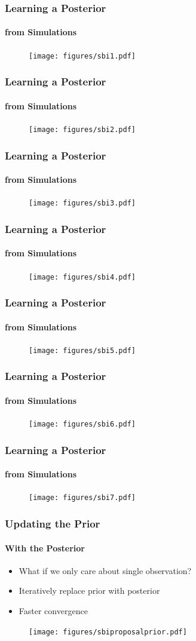 \documentclass[9pt, aspectratio=169]{beamer}
\begin{document}
\begin{frame}
\frametitle{Learning a Posterior}
\framesubtitle{from Simulations}
\begin{figure}
	\texttt{[image: figures/sbi1.pdf]}
\end{figure}
\end{frame} 
\begin{frame}
\frametitle{Learning a Posterior}
\framesubtitle{from Simulations}
\begin{figure}
	\texttt{[image: figures/sbi2.pdf]}
\end{figure}
\end{frame} \begin{frame}
\frametitle{Learning a Posterior}
\framesubtitle{from Simulations}
\begin{figure}
\texttt{[image: figures/sbi3.pdf]}
\end{figure}
\end{frame} \begin{frame}
\frametitle{Learning a Posterior}
\framesubtitle{from Simulations}
\begin{figure}
\texttt{[image: figures/sbi4.pdf]}
\end{figure}
\end{frame} \begin{frame}
\frametitle{Learning a Posterior}
\framesubtitle{from Simulations}
\begin{figure}
\texttt{[image: figures/sbi5.pdf]}
\end{figure}
\end{frame} \begin{frame}
\frametitle{Learning a Posterior}
\framesubtitle{from Simulations}
\begin{figure}
\texttt{[image: figures/sbi6.pdf]}
\end{figure}
\end{frame}\begin{frame}
\frametitle{Learning a Posterior}
\framesubtitle{from Simulations}
\begin{figure}
\texttt{[image: figures/sbi7.pdf]}
\end{figure}
\end{frame}





\begin{frame}
\frametitle{Updating the Prior}
\framesubtitle{With the Posterior}
\begin{itemize}
	\item What if we only care about single observation?
	\item Iteratively replace prior with posterior
	\item Faster convergence
\end{itemize}
\begin{figure}
	\texttt{[image: figures/sbiproposalprior.pdf]}
\end{figure}
\end{frame} 
\end{document}
